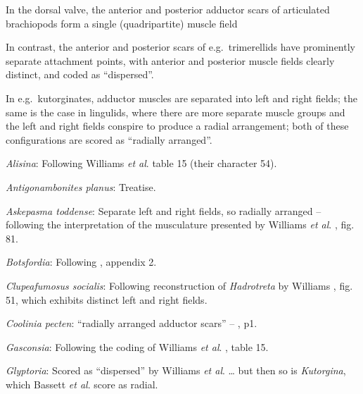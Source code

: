 \documentclass[openany]{book}
\begin{document}
In the dorsal valve, the anterior and posterior adductor scars of
articulated brachiopods form a single (quadripartite) muscle field
\citep[p.~201]{Williams2000LinguliformeaCraniiformea}

In contrast, the anterior and posterior scars of e.g.~trimerellids have
prominently separate attachment points, with anterior and posterior
muscle fields clearly distinct, and coded as ``dispersed''.

In e.g.~kutorginates, adductor muscles are separated into left and right
fields; the same is the case in lingulids, where there are more separate
muscle groups and the left and right fields conspire to produce a radial
arrangement; both of these configurations are scored as ``radially
arranged''.

\hypertarget{Alisina-coding-84}{}
\emph{Alisina}: Following Williams \emph{et al}.
\citeyearpar{Williams2000LinguliformeaCraniiformea} table 15 (their
character 54).

\hypertarget{Antigonambonites_planus-coding-84}{}
\emph{Antigonambonites planus}: Treatise.

\hypertarget{Askepasma_toddense-coding-84}{}
\emph{Askepasma toddense}: Separate left and right fields, so radially
arranged -- following the interpretation of the musculature presented by
Williams \emph{et al}.
\citeyearpar{Williams2000LinguliformeaCraniiformea}, fig. 81.

\hypertarget{Botsfordia-coding-84}{}
\emph{Botsfordia}: Following \citet{Williams1998Thediversity}, appendix
2.

\hypertarget{Clupeafumosus_socialis-coding-84}{}
\emph{Clupeafumosus socialis}: Following reconstruction of
\emph{Hadrotreta} by Williams
\citeyearpar{Williams2000LinguliformeaCraniiformea}, fig. 51, which
exhibits distinct left and right fields.

\hypertarget{Coolinia_pecten-coding-84}{}
\emph{Coolinia pecten}: ``radially arranged adductor scars'' --
\citet{Bassett2017Earliestontogeny}, p1.

\hypertarget{Gasconsia-coding-84}{}
\emph{Gasconsia}: Following the coding of Williams \emph{et al}.
\citeyearpar{Williams2000LinguliformeaCraniiformea}, table 15.

\hypertarget{Glyptoria-coding-84}{}
\emph{Glyptoria}: Scored as ``dispersed'' by Williams \emph{et al}.
\citeyearpar{Williams1998Thediversity} \ldots{} but then so is
\emph{Kutorgina}, which Bassett \emph{et al}.
\citeyearpar{Bassett2001Functionalmorphology} score as radial.
\end{document}
